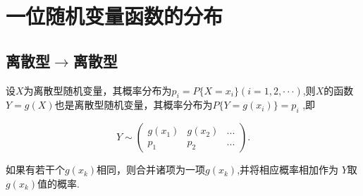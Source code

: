 \chapter{一位随机变量函数的分布}

\section{离散型$\rightarrow$离散型}
设$X$为离散型随机变量，其概率分布为$p_i=P\{X=x_i\}(i=1,2,\cdotp\cdotp\cdotp)$,则$X$的函数$Y=g(X)$也是离散型随机变量，其概率分布为$P\{Y=g(x_i)\}=p_i$ ,即

$$Y\sim\begin{pmatrix}g(x_1)&g(x_2)&...\\p_1&p_2&...\end{pmatrix}.$$

如果有若干个$g(x_k)$相同，则合并诸项为一项$g(x_k)$,并将相应概率相加作为 $Y$取 $g(x_k)$值的概率.
